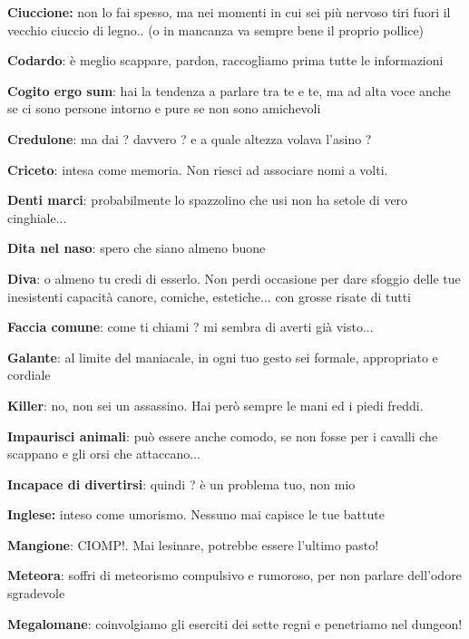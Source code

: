 \documentclass[a4paper,11pt,twoside,openany]{book}
\begin{document}
\textbf{Ciuccione:} non lo fai spesso, ma nei momenti in cui sei più nervoso tiri fuori il vecchio ciuccio di legno.. (o in mancanza va sempre bene il proprio pollice)

\textbf{Codardo}: è meglio scappare, pardon, raccogliamo prima tutte le informazioni

\textbf{Cogito ergo sum}: hai la tendenza a parlare tra te e te, ma ad alta voce anche se ci sono persone intorno e pure se non sono amichevoli

\textbf{Credulone}: ma dai ? davvero ? e a quale altezza volava l'asino ?

\textbf{Criceto}: intesa come memoria. Non riesci ad associare nomi a volti.

\textbf{Denti marci}: probabilmente lo spazzolino che usi non ha setole di vero cinghiale...

\textbf{Dita nel naso}: spero che siano almeno buone

\textbf{Diva}: o almeno tu credi di esserlo. Non perdi occasione per dare sfoggio delle tue inesistenti capacità canore, comiche, estetiche... con grosse risate di tutti

\textbf{Faccia comune}: come ti chiami ? mi sembra di averti già visto...

\textbf{Galante}: al limite del maniacale, in ogni tuo gesto sei formale, appropriato e cordiale

\textbf{Killer}: no, non sei un assassino. Hai però sempre le mani ed i piedi freddi.

\textbf{Impaurisci animali}: può essere anche comodo, se non fosse per i cavalli che scappano e gli orsi che attaccano...

\textbf{Incapace di divertirsi}: quindi ? è un problema tuo, non mio

\textbf{Inglese:} inteso come umorismo. Nessuno mai capisce le tue battute

\textbf{Mangione}: CIOMP!. Mai lesinare, potrebbe essere l'ultimo pasto!

\textbf{Meteora}: soffri di meteorismo compulsivo e rumoroso, per non parlare dell'odore sgradevole

\textbf{Megalomane}: coinvolgiamo gli eserciti dei sette regni e penetriamo nel dungeon!
\end{document}
